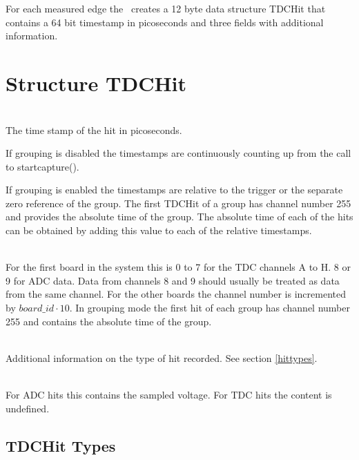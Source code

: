 For each measured edge the \deviceName\ creates a 12 byte data structure TDCHit that contains a 64 bit timestamp in picoseconds and three fields with additional information. 

\section{Structure TDCHit}
\label{TDCHit}
\\
The time stamp of the hit in picoseconds. 

If grouping is disabled the timestamps are continuously counting up from the call to \textsf{start\tu capture()}.

If grouping is enabled the timestamps are relative to the trigger or the separate zero reference of the group. 
The first TDCHit of a group has channel number 255 and provides the absolute time of the group. 
The absolute time of each of the hits can be obtained by adding this value to each of the relative timestamps.

\\
For the first board in the system this is 0 to 7 for the TDC channels A to H. 8 or 9 for ADC data. Data from channels 8 and 9 should usually be treated as data from the same channel. 
For the other boards the channel number is incremented by $board\_id \cdot 10$.
In grouping mode the first hit of each group has channel number 255 and contains the absolute time of the group.

\\
Additional information on the type of hit recorded. See section \ref{hittypes}.

\\
For ADC hits this contains the sampled voltage. For TDC hits the content is undefined.

\newpage
\subsection{TDCHit Types \label{hittypes}}
\newcommand{\HTYPE}{\PREFIX TDCHIT\tu TYPE\tu}

